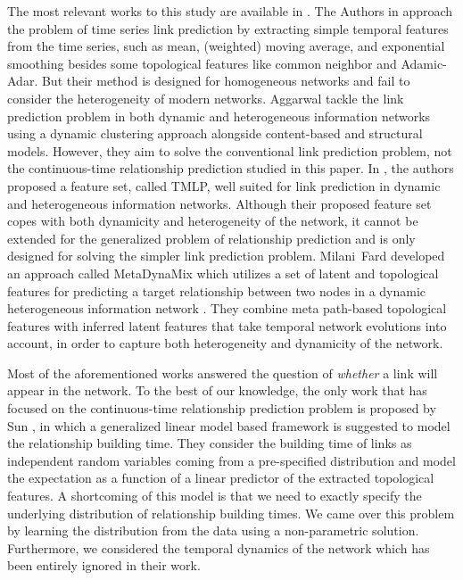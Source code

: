 The most relevant works to this study are available in \cite{hajibagheri2016leveraging, aggarwal2012dynamic, sett2017temporal, amin:ecir19, sun2012will}. The Authors in \cite{hajibagheri2016leveraging} approach the problem of time series link prediction by extracting simple temporal features from the time series, such as mean, (weighted) moving average, and exponential smoothing besides some topological features like common neighbor and Adamic-Adar. But their method is designed for homogeneous networks and fail to consider the heterogeneity of modern networks. Aggarwal \etal{} \cite{aggarwal2012dynamic} tackle the link prediction problem in both dynamic and heterogeneous information networks using a dynamic clustering approach alongside content-based and structural models. However, they aim to solve the conventional link prediction problem, not the continuous-time relationship prediction studied in this paper. In \cite{sett2017temporal}, the authors proposed a feature set, called TMLP, well suited for link prediction in dynamic and heterogeneous information networks. Although their proposed feature set copes with both dynamicity and heterogeneity of the network, it cannot be extended for the generalized problem of relationship prediction and is only designed for solving the simpler link prediction problem. Milani~Fard \etal{} developed an approach called MetaDynaMix which utilizes a set of latent and topological features for predicting a target relationship between two nodes in a dynamic heterogeneous information network \cite{amin:ecir19}. They combine meta path-based topological features with inferred latent features that take temporal network evolutions into account, in order to capture both heterogeneity and dynamicity of the network.

Most of the aforementioned works answered the question of \emph{whether} a link will appear in the network. To the best of our knowledge, the only work that has focused on the continuous-time relationship prediction problem is proposed by Sun \etal{} \cite{sun2012will}, in which a generalized linear model based framework is suggested to model the relationship building time. They consider the building time of links as independent random variables coming from a pre-specified distribution and model the expectation as a function of a linear predictor of the extracted topological features. A shortcoming of this model is that we need to exactly specify the underlying distribution of relationship building times. We came over this problem by learning the distribution from the data using a non-parametric solution. Furthermore, we considered the temporal dynamics of the network which has been entirely ignored in their work.

